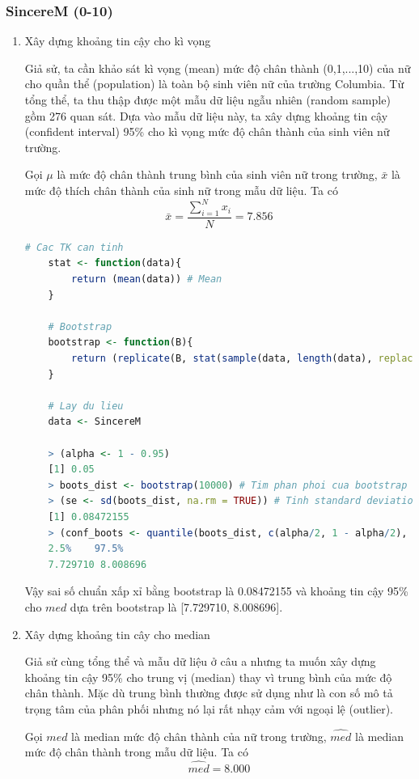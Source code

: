 \documentclass[a4paper,12pt]{article}
\begin{document}
	\subsubsection{SincereM (0-10)}
	\begin{enumerate}[label = \alph*)]
	\item Xây dựng khoảng tin cậy cho kì vọng
	
	Giả sử, ta cần khảo sát kì vọng (mean) mức độ chân thành (0,1,...,10) của nữ cho quần thể (population) là toàn bộ sinh viên nữ của trường Columbia. Từ tổng thể, ta thu thập được một mẫu dữ liệu ngẫu nhiên (random sample) gồm 276 quan sát. Dựa vào mẫu dữ liệu này, ta xây dựng khoảng tin cậy (confident interval) 95\% cho kì vọng mức độ chân thành của sinh viên nữ trường.
	
	Gọi $\mu$ là mức độ chân thành trung bình của sinh viên nữ trong trường, $\bar{x}$ là mức độ thích chân thành của sinh nữ trong mẫu dữ liệu. Ta có
	$$\bar{x} = \frac{\sum_{i = 1}^{N}x_i}{N} =  7.856$$
	\begin{lstlisting}[language=R]
	# Cac TK can tinh
	stat <- function(data){
		return (mean(data)) # Mean
	}
	
	# Bootstrap
	bootstrap <- function(B){
		return (replicate(B, stat(sample(data, length(data), replace = TRUE))))
	}
	
	# Lay du lieu
	data <- SincereM
	
	> (alpha <- 1 - 0.95)
	[1] 0.05
	> boots_dist <- bootstrap(10000) # Tim phan phoi cua bootstrap
	> (se <- sd(boots_dist, na.rm = TRUE)) # Tinh standard deviation (missing value se bi bo qua)
	[1] 0.08472155
	> (conf_boots <- quantile(boots_dist, c(alpha/2, 1 - alpha/2), na.rm = TRUE)) # Tim khoang tin cay cho mean
	2.5%    97.5% 
	7.729710 8.008696 
	\end{lstlisting}
	Vậy sai số chuẩn xấp xỉ bằng bootstrap là 0.08472155 và khoảng tin cậy 95\% cho $med$ dựa trên bootstrap
	là [7.729710, 8.008696].
	\item Xây dựng khoảng tin cây cho median
	
	Giả sử cùng tổng thể và mẫu dữ liệu ở câu a nhưng ta muốn xây dựng khoảng tin cậy 95\% cho
	trung vị (median) thay vì trung bình của mức độ chân thành. Mặc dù trung bình thường được sử dụng như
	là con số mô tả trọng tâm của phân phối nhưng nó lại rất nhạy cảm với ngoại lệ (outlier).
	
	Gọi $med$ là median mức độ chân thành của nữ trong trường, $\hat{med}$ là median mức độ chân thành trong mẫu dữ liệu. Ta có
	$$\hat{med} = 8.000$$
	

\end{enumerate}
\end{document}
